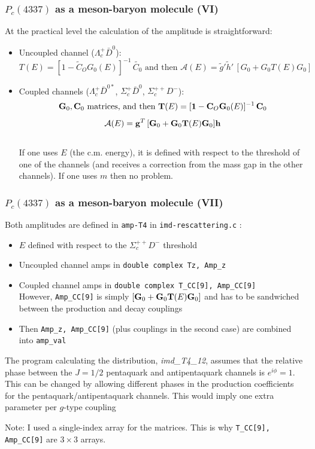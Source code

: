 \documentclass[utf8,10pt]{beamer}
\begin{document}
\begin{frame}
\frametitle{$P_{c}(4337)$ as a meson-baryon molecule (VI)}

At the practical level the calculation of the amplitude is straightforward:

\begin{itemize}
\item Uncoupled channel ($\Lambda_c^+ \bar{D}^0$):
  {\small
  $$T(E) = [1 - \tilde{C}_O G_0(E)]^{-1}\,\tilde{C_0} \,\, \mbox{and then}
  \,\,
  \mathcal{A}(E) = \tilde{g}' \tilde{h}'\,[ G_0 + G_0 T(E) G_0]$$}

\item Coupled channels ($\Lambda_c^+ \bar{D}^{0*}$, $\Sigma_c^+ \bar{D}^0$, $\Sigma_c^{++} D^{-}$):
  {\small
    $$
    {\bf G}_0, {\bf C}_0 \,\, \mbox{matrices, and then} \,\, {\bf T}(E) = [{\bf 1} - {\bf C}_O {\bf G}_0(E)]^{-1}\,{\bf C}_0 $$
    $$
    \mathcal{A}(E) = {\bf g}^T \,[ {\bf G}_0 + {\bf G}_0 {\bf T}(E) {\bf G}_0]
            {\bf h}$$} \\ 
  {\small If one uses $E$ (the c.m. energy), it is defined with respect to
  the threshold of one of the channels (and receives a correction from
  the mass gap in the other channels). If one uses $m$ then no problem.}
\end{itemize}

\end{frame}
\begin{frame}
\frametitle{$P_{c}(4337)$ as a meson-baryon molecule (VII)}


Both amplitudes are defined in \texttt{amp-T4} in \texttt{imd-rescattering.c} :
\begin{itemize}
\item $E$ defined with respect to the $\Sigma_c^{++} D^{-}$ threshold
\item Uncoupled channel amps in \texttt{double complex Tz, Amp\_z}
\item Coupled channel amps in \texttt{double complex T\_CC[9], Amp\_CC[9]} \\
  However, \texttt{Amp\_CC[9]} is simply $[ {\bf G}_0 + {\bf G}_0 {\bf T}(E) {\bf G}_0]$ and has to be sandwiched between the production and decay couplings
\item Then \texttt{Amp\_z, Amp\_CC[9]} (plus couplings in the second case)
  are combined into \texttt{amp\_val}
\end{itemize}

The program calculating the distribution, {\it imd\_T4\_12}, assumes that
the relative phase between the $J=1/2$ pentaquark and antipentaquark channels
is $e^{i \phi} = 1$. This can be changed by allowing different phases
in the production coefficients for the pentaquark/antipentaquark channels.
This would imply one extra parameter per $g$-type coupling

\vspace{0.15cm}

{\scriptsize 
Note: I used a single-index array for the matrices. This is why
\texttt{T\_CC[9], Amp\_CC[9]} are $3 \times 3$ arrays.}

\end{frame}
\end{document}

